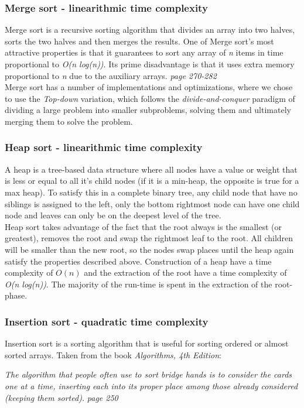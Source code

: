 \subsubsection*{Merge sort - linearithmic time complexity}
\label{sec:1.2.2}

Merge sort is a recursive sorting algorithm that divides an array into two halves, sorts the two halves and then merges the results. One of Merge sort’s most attractive properties is
that it guarantees to sort any array of \emph{n} items in time proportional to \emph{O(n log(n))}. Its prime disadvantage is that it uses extra memory proportional to \emph{n} due to the auxiliary arrays. \cite{algo} \emph{page 270-282}\\
Merge sort has a number of implementations and optimizations, where we chose to use the \emph{Top-down} variation, which follows the \emph{divide-and-conquer} paradigm of dividing a large problem into smaller subproblems, solving them and ultimately merging them to solve the problem.


\subsubsection*{Heap sort - linearithmic time complexity}
\label{sec:1.2.3}
A heap is a tree-based data structure where all nodes have a value or weight that is less or equal to all it's child nodes (if it is a min-heap, the opposite is true for a max heap). To satisfy this in a complete binary tree, any child node that have no siblings is assigned to the left, only the bottom rightmost node can have one child node and leaves can only be on the deepest level of the tree. \cite{umd12}\\
Heap sort takes advantage of the fact that the root always is the smallest (or greatest), removes the root and swap the rightmost leaf to the root. All children will be smaller than the new root, so the nodes swap places until the heap again satisfy the properties described above. \cite{umd13} 
Construction of a heap have a time complexity of \(O(n)\) and the extraction of the root have a  time complexity of \emph{O(n log(n))}. The majority of the run-time is spent in the extraction of the root-phase. \cite{umd14}


\subsubsection*{Insertion sort - quadratic time complexity}
\label{sec:1.2.4}
Insertion sort is a sorting algorithm that is useful for sorting ordered or almost sorted arrays. Taken from the book \emph{Algorithms, 4th Edition}:
\begin{displayquote}
\emph{The algorithm that people often use to sort bridge hands is to consider the cards one at a time, inserting each into its proper place among those already considered (keeping them sorted).} \cite{algo} \emph{page 250}
\end{displayquote}
\nobreak

